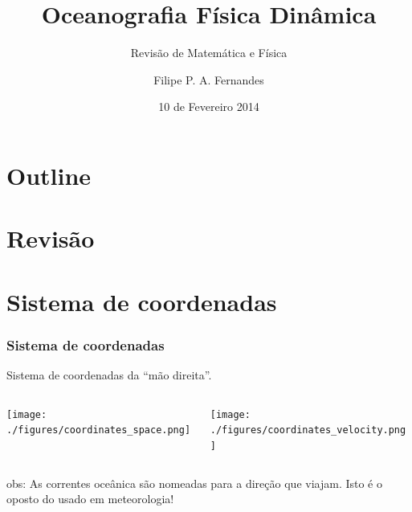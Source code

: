 \title[Aula 01]{Oceanografia Física Dinâmica}
\subtitle{Revisão de Matemática e Física}
\author[Filipe Fernandes]{Filipe P. A. Fernandes}
\date[Fevereiro 2014]{10 de Fevereiro 2014}




\begin{frame}[plain]
  \titlepage
\end{frame}

\section*{Outline}
\begin{frame}
\tableofcontents
\end{frame}

\section{Revisão}
\section{Sistema de coordenadas}

\begin{frame}
\frametitle{Sistema de coordenadas}
  \begin{block}{}
    Sistema de coordenadas da ``mão direita''.
  \end{block}

  \vspace{0.3cm}

  \begin{columns}
    \begin{column}{0.5\textwidth}
      \texttt{[image: ./figures/coordinates\_space.png]}
    \end{column}

    \begin{column}{0.5\textwidth}
      \texttt{[image: ./figures/coordinates\_velocity.png]}
    \end{column}
  \end{columns}

  \vspace{0.5cm} \pause

  \scriptsize{obs: As correntes oceânica são nomeadas para a direção que
              viajam.  Isto é o oposto do usado em meteorologia!}
\end{frame}


